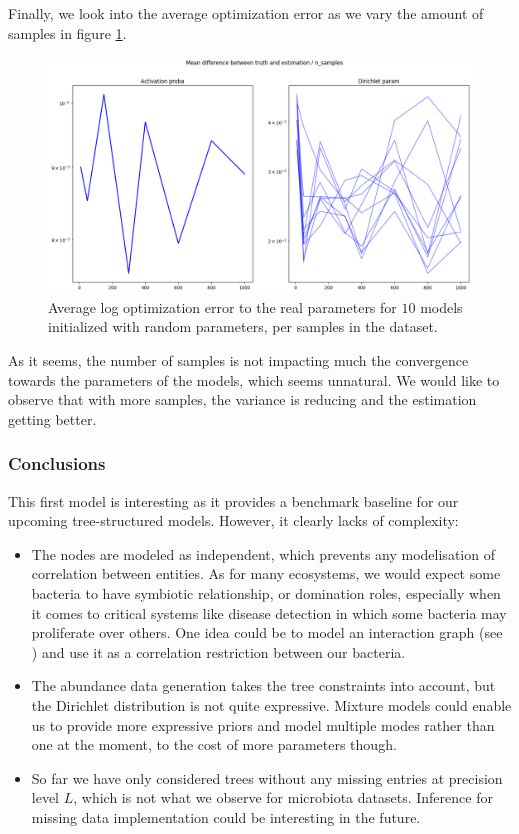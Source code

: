 Finally, we look into the average optimization error as we vary the amount of samples in figure \ref{fig:markovian_tree_model_error_mean_sample}.
\begin{figure}[H]
    \centering
    \includegraphics[scale=0.4]{images/markovian_tree_model_mean_error_samples}
    \caption{Average log optimization error to the real parameters for $10$ models initialized with random parameters, per samples in the dataset.}
    \label{fig:markovian_tree_model_error_mean_sample}
\end{figure}

As it seems, the number of samples is not impacting much the convergence towards the parameters of the models, which seems unnatural.
We would like to observe that with more samples, the variance is reducing and the estimation getting better.

\subsubsection{Conclusions}

This first model is interesting as it provides a benchmark baseline for our upcoming tree-structured models.
However, it clearly lacks of complexity:
\begin{itemize}
    \item The nodes are modeled as independent, which prevents any modelisation of correlation between entities.
          As for many ecosystems, we would expect some bacteria to have symbiotic relationship, or domination roles,
          especially when it comes to critical systems like disease detection in which some bacteria may proliferate over others.
          One idea could be to model an interaction graph (see \cite{momal_tree}) and use it as a correlation restriction between our bacteria.
    \item The abundance data generation takes the tree constraints into account, but the Dirichlet distribution is not quite expressive.
          Mixture models could enable us to provide more expressive priors and model multiple modes rather than one at the moment, to the cost of more parameters though.
    \item So far we have only considered trees without any missing entries at precision level $L$, which is not what we observe for microbiota datasets.
          Inference for missing data implementation could be interesting in the future.
\end{itemize}